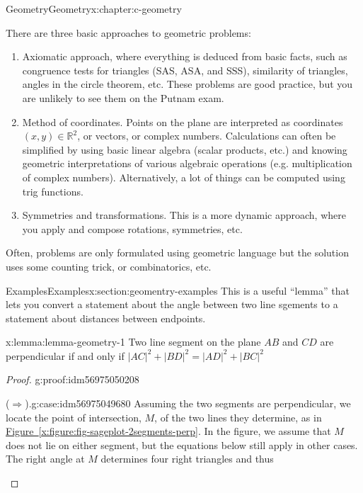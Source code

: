 \documentclass[twoside,10pt,]{book}
\newcommand{\xreffont}{\relax}
\numberwithin{equation}{section}
\begin{document}
\begin{chapterptx}{Geometry}{}{Geometry}{}{}{x:chapter:c-geometry}
\begin{introduction}{}%
There are three basic approaches to geometric problems:%
\begin{enumerate}[label=(\arabic*)]
\item{}Axiomatic approach, where everything is deduced from basic facts, such as congruence tests for triangles (SAS, ASA, and SSS), similarity of triangles, angles in the circle theorem, etc. These problems are good practice, but you are unlikely to see them on the Putnam exam.%
\item{}Method of coordinates. Points on the plane are interpreted as coordinates \((x,y) \in \mathbb{R}^2\), or vectors, or complex numbers. Calculations can often be simplified by using basic linear algebra (scalar products, etc.) and knowing geometric interpretations of various algebraic operations (e.g. multiplication of complex numbers). Alternatively, a lot of things can be computed using trig functions.%
\item{}Symmetries and transformations. This is a more dynamic approach, where you apply and compose rotations, symmetries, etc.%
\end{enumerate}
Often, problems are only formulated using geometric language but the solution uses some counting trick, or combinatorics, etc.%
\end{introduction}%
%
%
\typeout{************************************************}
\typeout{************************************************}
%
\begin{sectionptx}{Examples}{}{Examples}{}{}{x:section:geomentry-examples}
This is a useful ``lemma'' that lets you convert a statement about the angle between two line sgements to a statement about distances between endpoints.%
\begin{lemma}{}{}{x:lemma:lemma-geometry-1}%
Two line segment on the plane \(AB\) and \(CD\) are perpendicular if and only if \(\lvert AC \rvert^2 +  \lvert BD \rvert^2 = \lvert AD \rvert^2 + \lvert BC \rvert^2\)%
\end{lemma}
\begin{proof}{}{g:proof:idm56975050208}
\begin{case}{}{(\(\Rightarrow\)).}{g:case:idm56975049680}
Assuming the two segments are perpendicular, we locate the point of intersection, \(M\), of the two lines they determine, as in \hyperref[x:figure:fig-sageplot-2segments-perp]{Figure~{\xreffont\ref{x:figure:fig-sageplot-2segments-perp}}}.  In the figure, we assume that \(M\) does not lie on either segment, but the equations below still apply in other cases. The right angle at \(M\) determines four right triangles and thus%

\end{case}
\end{proof}
\end{sectionptx}
\end{chapterptx}
\end{document}
